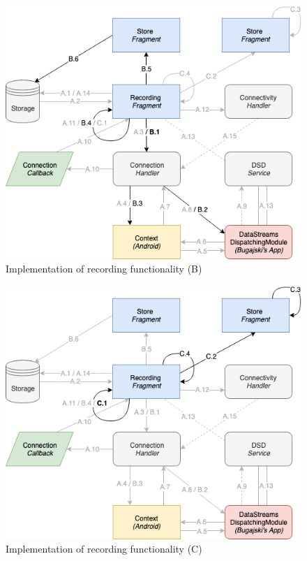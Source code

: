 \begin{figure}
    \centering
    \includegraphics[scale=0.6]{images/Recording_ImpB.png}
    \caption{Implementation of recording functionality (B)}
    \label{fig:impl_recordingB}
\end{figure}

\begin{figure}
    \centering
    \includegraphics[scale=0.6]{images/Recording_ImpC.png}
    \caption{Implementation of recording functionality (C)}
    \label{fig:impl_recordingC}
\end{figure}



